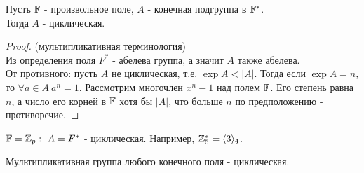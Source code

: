 \begin{theorem}
    Пусть $\mathbb{F}$ - произвольное поле, $A$ - конечная подгруппа в $\mathbb{F}^*$.\\
    Тогда $A$ - циклическая.
\end{theorem}
\begin{proof} (мультипликативная терминология)\\
    Из определения поля $F^*$ - абелева группа, а значит $A$ также абелева.\\
    От противного: пусть $A$ не циклическая, т.е. $\exp A < |A|$. Тогда если $\exp A = n$, то $\forall a \in A \ a^{n} = 1$. Рассмотрим многочлен $x^n - 1$ над полем $\mathbb{F}$. Его степень равна $n$, а число его корней в $\mathbb{F}$ хотя бы $|A|$, что больше $n$ по предположению - противоречие. 
\end{proof}
\begin{example}
    $\mathbb{F} = \mathbb{Z}_p: \ A = F^*$ - циклическая. Например, $\mathbb{Z}_5^* = \langle 3 \rangle_4$. 
\end{example}
\begin{consequense}
    Мультипликативная группа любого конечного поля - циклическая.
\end{consequense}
\setcounter{thcount}{0}
\setcounter{concount}{0}
\setcounter{subthcount}{0}
\setcounter{lemcount}{0}
\newpage